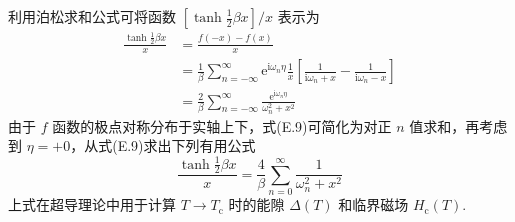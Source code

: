 利用泊松求和公式可将函数 $\left[\tanh\frac{1}{2}\beta x\right]/x$ 表示为
\begin{equation}
\begin{aligned}
  \frac{\tanh\frac{1}{2}\beta x}{x}
  &=\frac{f(-x)-f(x)}{x}\\
  &=\frac{1}{\beta}\sum_{n=-\infty}^{\infty}
  \mathrm{e}^{\mathrm{i}\omega_{n}\eta}\frac{1}{x}
  \left[\frac{1}{\mathrm{i}\omega_{n}+x}
  -\frac{1}{\mathrm{i}\omega_{n}-x}\right]\\
  &=\frac{2}{\beta}\sum_{n=-\infty}^{\infty}
  \frac{\mathrm{e}^{\mathrm{i}\omega_{n}\eta}}
  {\omega_{n}^{2}+x^{2}}
\end{aligned}
\end{equation}
由于 $f$ 函数的极点对称分布于实轴上下，式(E.9)可简化为对正 $n$ 值求和，再考虑到 $\eta=+0$，从式(E.9)求出下列有用公式
\begin{equation}
  \frac{\tanh\frac{1}{2}\beta x}{x}
  =\frac{4}{\beta}\sum_{n=0}^{\infty}
  \frac{1}{\omega_{n}^{2}+x^{2}}
\end{equation}
上式在超导理论中用于计算 $T\to T_{\mathrm{c}}$ 时的能隙 $\Delta(T)$ 和临界磁场 $H_{\mathrm{c}}(T)$.
